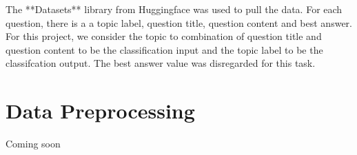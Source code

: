 \documentclass{article}
\begin{document}
The **Datasets** library from Huggingface was used to pull the data. For each question, there is a a topic label, question title, question content and best answer. For 
this project, we consider the topic to combination of question title and question content to be the classification input and the topic label to be the classifcation output. 
The best answer value was disregarded for this task.

\section{Data Preprocessing}

Coming soon

\section{}



\end{document}
